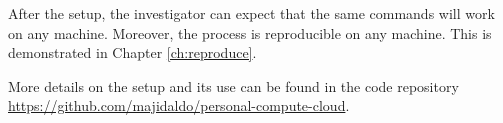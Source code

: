 After the setup, the investigator can expect that the same commands will work on any machine.
%
Moreover, the process is reproducible on any machine.
%
This is demonstrated in Chapter \ref{ch:reproduce}.


More details on the setup and its use can be found in the code repository \url{https://github.com/majidaldo/personal-compute-cloud}.









